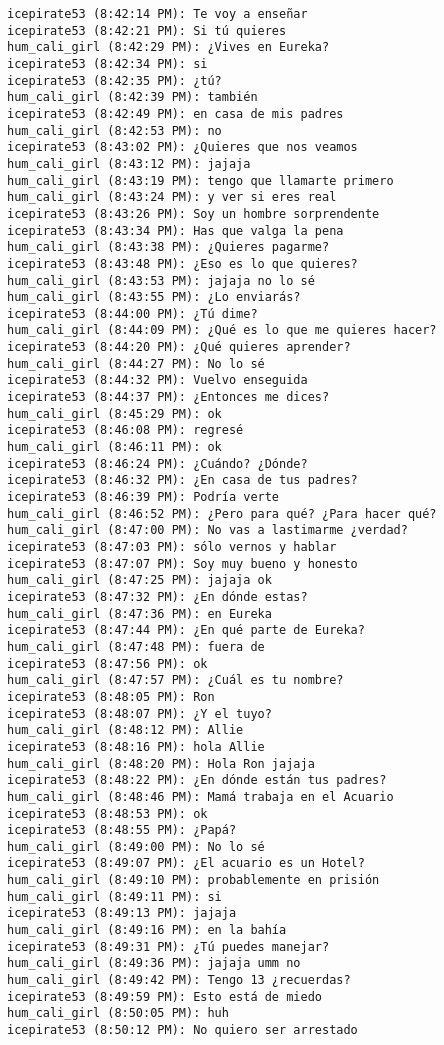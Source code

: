 \begin{verbatim}
icepirate53 (8:42:14 PM): Te voy a enseñar
icepirate53 (8:42:21 PM): Si tú quieres
hum_cali_girl (8:42:29 PM): ¿Vives en Eureka?
icepirate53 (8:42:34 PM): si
icepirate53 (8:42:35 PM): ¿tú?
hum_cali_girl (8:42:39 PM): también
icepirate53 (8:42:49 PM): en casa de mis padres
hum_cali_girl (8:42:53 PM): no
icepirate53 (8:43:02 PM): ¿Quieres que nos veamos
hum_cali_girl (8:43:12 PM): jajaja
hum_cali_girl (8:43:19 PM): tengo que llamarte primero
hum_cali_girl (8:43:24 PM): y ver si eres real
icepirate53 (8:43:26 PM): Soy un hombre sorprendente
icepirate53 (8:43:34 PM): Has que valga la pena
hum_cali_girl (8:43:38 PM): ¿Quieres pagarme?
icepirate53 (8:43:48 PM): ¿Eso es lo que quieres?
hum_cali_girl (8:43:53 PM): jajaja no lo sé
hum_cali_girl (8:43:55 PM): ¿Lo enviarás?
icepirate53 (8:44:00 PM): ¿Tú dime?
hum_cali_girl (8:44:09 PM): ¿Qué es lo que me quieres hacer?
icepirate53 (8:44:20 PM): ¿Qué quieres aprender?
hum_cali_girl (8:44:27 PM): No lo sé
icepirate53 (8:44:32 PM): Vuelvo enseguida
icepirate53 (8:44:37 PM): ¿Entonces me dices?
hum_cali_girl (8:45:29 PM): ok
icepirate53 (8:46:08 PM): regresé
hum_cali_girl (8:46:11 PM): ok
icepirate53 (8:46:24 PM): ¿Cuándo? ¿Dónde?
icepirate53 (8:46:32 PM): ¿En casa de tus padres?
icepirate53 (8:46:39 PM): Podría verte
hum_cali_girl (8:46:52 PM): ¿Pero para qué? ¿Para hacer qué?
hum_cali_girl (8:47:00 PM): No vas a lastimarme ¿verdad?
icepirate53 (8:47:03 PM): sólo vernos y hablar
icepirate53 (8:47:07 PM): Soy muy bueno y honesto
hum_cali_girl (8:47:25 PM): jajaja ok
icepirate53 (8:47:32 PM): ¿En dónde estas?
hum_cali_girl (8:47:36 PM): en Eureka
icepirate53 (8:47:44 PM): ¿En qué parte de Eureka?
hum_cali_girl (8:47:48 PM): fuera de
icepirate53 (8:47:56 PM): ok
hum_cali_girl (8:47:57 PM): ¿Cuál es tu nombre?
icepirate53 (8:48:05 PM): Ron
icepirate53 (8:48:07 PM): ¿Y el tuyo?
hum_cali_girl (8:48:12 PM): Allie
icepirate53 (8:48:16 PM): hola Allie
hum_cali_girl (8:48:20 PM): Hola Ron jajaja
icepirate53 (8:48:22 PM): ¿En dónde están tus padres?
hum_cali_girl (8:48:46 PM): Mamá trabaja en el Acuario
icepirate53 (8:48:53 PM): ok
icepirate53 (8:48:55 PM): ¿Papá?
hum_cali_girl (8:49:00 PM): No lo sé
icepirate53 (8:49:07 PM): ¿El acuario es un Hotel?
hum_cali_girl (8:49:10 PM): probablemente en prisión
hum_cali_girl (8:49:11 PM): si
icepirate53 (8:49:13 PM): jajaja
hum_cali_girl (8:49:16 PM): en la bahía
icepirate53 (8:49:31 PM): ¿Tú puedes manejar?
hum_cali_girl (8:49:36 PM): jajaja umm no
hum_cali_girl (8:49:42 PM): Tengo 13 ¿recuerdas?
icepirate53 (8:49:59 PM): Esto está de miedo
hum_cali_girl (8:50:05 PM): huh
icepirate53 (8:50:12 PM): No quiero ser arrestado

\end{verbatim}

